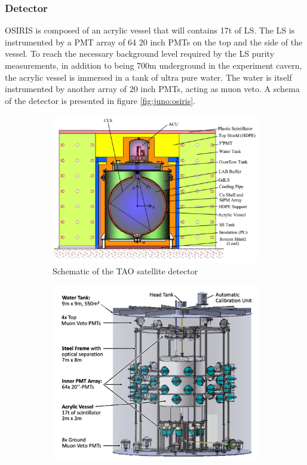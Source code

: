 \subsubsection{Detector}
OSIRIS is composed of an acrylic vessel that will contains 17t of LS. The LS is instrumented by a PMT array of 64 20 inch PMTs on the top and the side of the vessel. To reach the necessary background level required by the LS purity measurements, in addition to being 700m underground in the experiment cavern, the acrylic vessel is immersed in a tank of ultra pure water. The water is itself instrumented by another array of 20 inch PMTs, acting as muon veto. A schema of the detector is presented in figure \ref{fig:juno:osiris}.

\begin{figure}[ht]
  \centering
  \begin{subfigure}[t]{0.49\linewidth}
    \includegraphics[width=\linewidth]{images/juno/tao_schematic.png}
    \caption{Schematic of the TAO satellite detector}
    \label{fig:juno:tao}
  \end{subfigure}
  \hfill
  \begin{subfigure}[t]{0.49\linewidth}
    \includegraphics[width=\linewidth]{images/juno/osiris_schematic.png}

\end{subfigure}
\end{figure}
